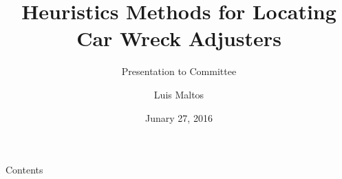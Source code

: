 \documentclass[10pt,usenames,dvipsnames,svgnames,table]{beamer}
\title{Heuristics Methods for Locating Car Wreck Adjusters}
\subtitle{Presentation to Committee}
\author{Luis Maltos}
\institute[PISIS]{
  Graduate Program in Systems Engineering \\
  FIME / UANL}
\date[Sinodales]{Junary 27, 2016}
\begin{document}
\begin{frame}
  \titlepage
\end{frame}

\begin{frame}{Contents}
  \tableofcontents
\end{frame}




%

\end{document}
